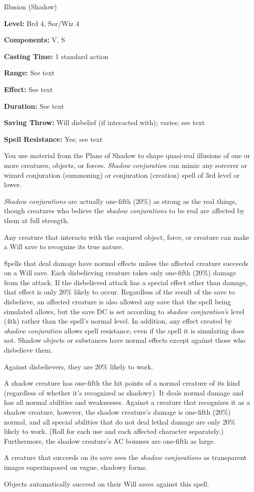 
Illusion (Shadow)

\textbf{Level:} Brd 4, Sor/Wiz 4

\textbf{Components:} V, S

\textbf{Casting Time:} 1 standard action

\textbf{Range:} See text

\textbf{Effect:} See text

\textbf{Duration:} See text

\textbf{Saving Throw:} Will disbelief (if interacted with); varies; see text

\textbf{Spell Resistance:} Yes; see text

You use material from the Plane of Shadow to shape quasi-real illusions of one 
or more creatures, objects, or forces. \textit{Shadow conjuration} can mimic any 
sorcerer or wizard conjuration (summoning) or conjuration (creation) spell of 3rd 
level or lower.

\textit{Shadow conjurations} are actually one-fifth (20\%) as strong as the real 
things, though creatures who believe the \textit{shadow conjurations} to be real 
are affected by them at full strength.

Any creature that interacts with the conjured object, force, or creature can make 
a Will save to recognize its true nature.

Spells that deal damage have normal effects unless the affected creature succeeds 
on a Will save. Each disbelieving creature takes only one-fifth (20\%) damage from 
the attack. If the disbelieved attack has a special effect other than damage, that 
effect is only 20\% likely to occur. Regardless of the result of the save to disbelieve, 
an affected creature is also allowed any save that the spell being simulated allows, 
but the save DC is set according to \textit{shadow conjuration'}s level (4th) rather 
than the spell's normal level. In addition, any effect created by \textit{shadow 
conjuration} allows spell resistance, even if the spell it is simulating does not. 
Shadow objects or substances have normal effects except against those who disbelieve 
them.

Against disbelievers, they are 20\% likely to work.

A shadow creature has one-fifth the hit points of a normal creature of its kind 
(regardless of whether it's recognized as shadowy). It deals normal damage and 
has all normal abilities and weaknesses. Against a creature that recognizes it 
as a shadow creature, however, the shadow creature's damage is one-fifth (20\%) 
normal, and all special abilities that do not deal lethal damage are only 20\% 
likely to work. (Roll for each use and each affected character separately.) Furthermore, 
the shadow creature's AC bonuses are one-fifth as large.

A creature that succeeds on its save sees the \textit{shadow conjurations} as transparent 
images superimposed on vague, shadowy forms.

Objects automatically succeed on their Will saves against this spell.

